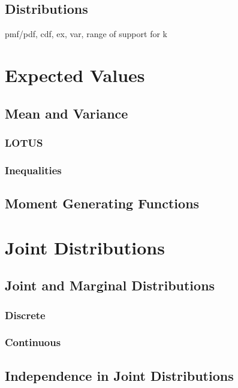 \documentclass[a4paper,10pt]{article}
\begin{document}
\subsection{Distributions}
pmf/pdf, cdf, ex, var, range of support for k



\newpage
\section{Expected Values}

\subsection{Mean and Variance}
\subsubsection{LOTUS}
\subsubsection{Inequalities}

\subsection{Moment Generating Functions}



\newpage
\section{Joint Distributions}

\subsection{Joint and Marginal Distributions}
\subsubsection{Discrete}
\subsubsection{Continuous}

\subsection{Independence in Joint Distributions}
\end{document}
